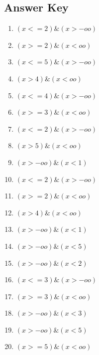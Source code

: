 \documentclass{article}
\begin{document}
\newpage

\subsection*{Answer Key}

\begin{enumerate}
\item $\displaystyle (x <= 2) \& (x > -oo) $ \ 
\item $\displaystyle (x >= 2) \& (x < oo) $ \ 
\item $\displaystyle (x <= 5) \& (x > -oo) $ \ 
\item $\displaystyle (x > 4) \& (x < oo) $ \ 
\item $\displaystyle (x <= 4) \& (x > -oo) $ \ 
\item $\displaystyle (x >= 3) \& (x < oo) $ \ 
\item $\displaystyle (x <= 2) \& (x > -oo) $ \ 
\item $\displaystyle (x > 5) \& (x < oo) $ \ 
\item $\displaystyle (x > -oo) \& (x < 1) $ \ 
\item $\displaystyle (x <= 2) \& (x > -oo) $ \ 
\item $\displaystyle (x >= 2) \& (x < oo) $ \ 
\item $\displaystyle (x > 4) \& (x < oo) $ \ 
\item $\displaystyle (x > -oo) \& (x < 1) $ \ 
\item $\displaystyle (x > -oo) \& (x < 5) $ \ 
\item $\displaystyle (x > -oo) \& (x < 2) $ \ 
\item $\displaystyle (x <= 3) \& (x > -oo) $ \ 
\item $\displaystyle (x >= 3) \& (x < oo) $ \ 
\item $\displaystyle (x > -oo) \& (x < 3) $ \ 
\item $\displaystyle (x > -oo) \& (x < 5) $ \ 
\item $\displaystyle (x >= 5) \& (x < oo) $ \ 

\end{enumerate}
\end{document}
